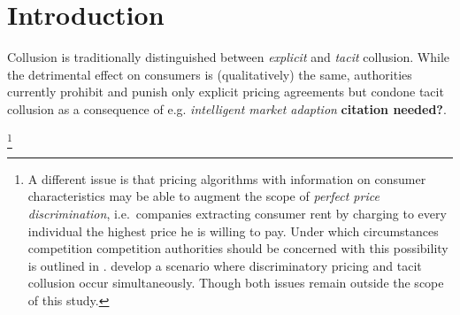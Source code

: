 \section{Introduction}

Collusion is traditionally distinguished between \emph{explicit} and \emph{tacit} collusion. While the detrimental effect on consumers is (qualitatively) the same, authorities currently prohibit and punish only explicit pricing agreements but condone tacit collusion as a consequence of e.g. \emph{intelligent market adaption} \textbf{citation needed?}.


\footnote{A different issue is that pricing algorithms with information on consumer characteristics may be able to augment the scope of \emph{perfect price discrimination}, i.e.\ companies extracting consumer rent by charging to every individual the highest price he is willing to pay. Under which circumstances competition competition authorities should be concerned with this possibility is outlined in \textcite{oecd_price_2016}. \textcite{ezrachi_algorithmic_2017} develop a scenario where discriminatory pricing and tacit collusion occur simultaneously. Though both issues remain outside the scope of this study.}